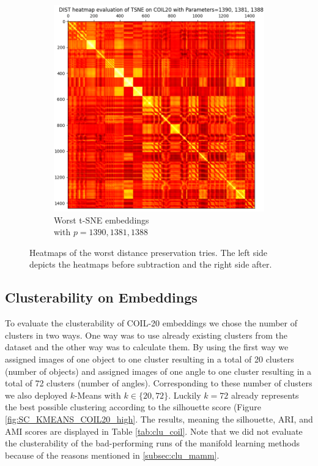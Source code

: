 \begin{figure}[!]
\begin{subfigure}[t]{0.49\columnwidth}
    	\includegraphics[width=\columnwidth]{images/dist_heatmap_tsne_coil20_1-3worst.png}
    	\caption{Worst t-SNE embeddings \\ with $p=1390,1381,1388$}
        \label{fig:dist_heatmap_tsne_coil20_1-3worst}
    \end{subfigure}
     \caption[Heatmaps of Worst t-SNE Distance Preservations]{Heatmaps of the worst distance preservation tries. The left side depicts the heatmaps before subtraction and the right side after.}
    \label{fig:heat_worst_coil_tsne}
\end{figure}

\subsection{Clusterability on Embeddings} \label{subsec:clu_on_coil}

To evaluate the clusterability of COIL-20 embeddings we chose the number of clusters in two ways. One way was to use already existing clusters from the dataset and the other way was to calculate them. By using the first way we assigned images of one object to one cluster resulting in a total of 20 clusters (number of objects) and assigned images of one angle to one cluster resulting in a total of 72 clusters (number of angles). Corresponding to these number of clusters we also deployed $k$-Means with $k\in\{20,72\}$. Luckily $k=72$ already represents the best possible clustering according to the silhouette score (Figure \ref{fig:SC_KMEANS_COIL20_high}. The results, meaning the silhouette, ARI, and AMI scores are displayed in Table \ref{tab:clu_coil}. Note that we did not evaluate the clusterability of the bad-performing runs of the manifold learning methods because of the reasons mentioned in \ref{subsec:clu_mamm}.

